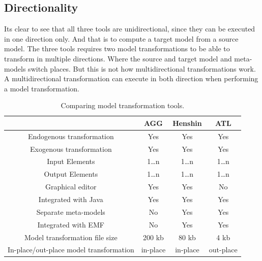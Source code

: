 \subsection{Directionality}

Its clear to see that all three tools are unidirectional, since they can be
executed in one direction only. And that is to compute a target model from a
source model. The three tools requires two model transformations to be able to
transform in multiple directions. Where the source and target model and
meta-models switch places. But this is not how multidirectional transformations
work. A multidirectional transformation can execute in both direction when
performing a model transformation.

\begin{table}[ht]
\centering
\begin{tabular}{| c | c | c | c |}
\hline
 & AGG & Henshin & ATL \\
\hline
Endogenous transformation & \cellcolor{green!25}Yes &
\cellcolor{green!25}Yes & \cellcolor{green!25}Yes \\

Exogenous transformation & \cellcolor{green!25}Yes &
\cellcolor{green!25}Yes & \cellcolor{green!25}Yes \\

Input Elements & 1\ldots n & 1\ldots n & 1\ldots n\\
Output Elements & 1\ldots n & 1\ldots n & 1\ldots n\\
Graphical editor &\cellcolor{green!25}Yes &
\cellcolor{green!25}Yes &\cellcolor{red!25}No  \\
Integrated with Java & \cellcolor{green!25}Yes &
\cellcolor{green!25}Yes & \cellcolor{green!25}Yes \\
Separate meta-models & \cellcolor{red!25}No &
\cellcolor{green!25}Yes & \cellcolor{green!25}Yes \\
Integrated with EMF & \cellcolor{red!25}No &
\cellcolor{green!25}Yes & \cellcolor{green!25}Yes \\
Model transformation file size &200 kb &80 kb &4 kb \\
In-place/out-place model transformation &in-place &
in-place &out-place \\
\hline

\end{tabular}
\caption [Comparing model transformation tools]
{Comparing model transformation tools.}
\end{table}

\newpage




